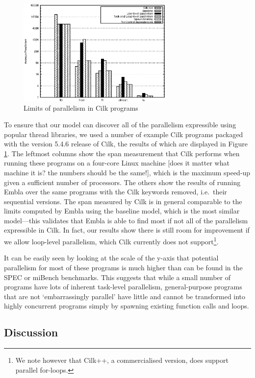 \begin{figure}
 \centering
 \includegraphics[width=3in]{cilk}
 \caption{Limits of parallelism in Cilk programs}
 \label{cilk}
\end{figure}

To ensure that our model can discover all of the parallelism expressible using popular thread libraries, we used a number of example Cilk programs packaged with the version 5.4.6 release of Cilk, the results of which are displayed in Figure \ref{cilk}.
The leftmost columns show the span measurement that Cilk performs when running these programs on a four-core Linux machine [does it matter what machine it is? the numbers should be the same!], which is the maximum speed-up given a sufficient number of processors.
The others show the results of running Embla over the same programs with the Cilk keywords removed, i.e.\ their sequential versions.
The span measured by Cilk is in general comparable to the limits computed by Embla using the baseline model, which is the most similar model---this validates that Embla is able to find most if not all of the parallelism expressible in Cilk.
In fact, our results show there is still room for improvement if we allow loop-level parallelism, which Cilk currently does not support\footnote{We note however that Cilk++, a commercialised version, does support parallel for-loops.}.

It can be easily seen by looking at the scale of the y-axis that potential parallelism for most of these programs is much higher than can be found in the SPEC or miBench benchmarks.
This suggests that while a small number of programs have lots of inherent task-level parallelism, general-purpose programs that are not `embarrassingly parallel' have little and cannot be transformed into highly concurrent programs simply by spawning existing function calls and loops.

\subsection{Discussion}

